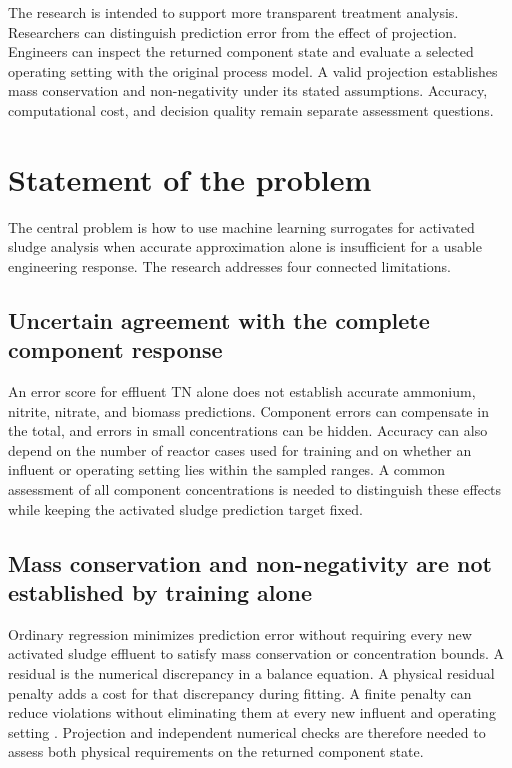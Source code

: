 The research is intended to support more transparent treatment analysis. Researchers can distinguish prediction error from the effect of projection. Engineers can inspect the returned component state and evaluate a selected operating setting with the original process model. A valid projection establishes mass conservation and non-negativity under its stated assumptions. Accuracy, computational cost, and decision quality remain separate assessment questions.

\section{Statement of the problem}

The central problem is how to use machine learning surrogates for activated sludge analysis when accurate approximation alone is insufficient for a usable engineering response. The research addresses four connected limitations.

\subsection{Uncertain agreement with the complete component response}

An error score for effluent TN alone does not establish accurate ammonium, nitrite, nitrate, and biomass predictions. Component errors can compensate in the total, and errors in small concentrations can be hidden. Accuracy can also depend on the number of reactor cases used for training and on whether an influent or operating setting lies within the sampled ranges. A common assessment of all component concentrations is needed to distinguish these effects while keeping the activated sludge prediction target fixed.

\subsection{Mass conservation and non-negativity are not established by training alone}

Ordinary regression minimizes prediction error without requiring every new activated sludge effluent to satisfy mass conservation or concentration bounds. A residual is the numerical discrepancy in a balance equation. A physical residual penalty adds a cost for that discrepancy during fitting. A finite penalty can reduce violations without eliminating them at every new influent and operating setting \citep{Raissi2019,Hansen2024}. Projection and independent numerical checks are therefore needed to assess both physical requirements on the returned component state.

